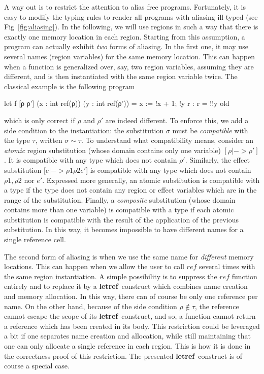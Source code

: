 \documentclass[a4paper]{llncs}
\newcommand{\letml}{{\bf let}}
\newcommand{\refml}{{\bf ref}}
\begin{document}
A way out is to restrict the attention to alias free programs. Fortunately, it
is easy to modify the typing rules to render all programs with aliasing
ill-typed (see Fig~\ref{fig:aliasing}). In the following, we will use regions
in such a way that there is exactly one memory location in each region.
Starting from this assumption, a program can actually exhibit {\em two} forms
of aliasing. In the first one, it may use several names (region variables) for
the same memory location. This can happen when a function is generalized over,
say, two region variables, assuming they are different, and is then
instantiated with the same region variable twice. The classical example is the
following program
\begin{who}
  let f [ρ ρ'] (x : int ref(ρ)) (y : int ref(ρ')) =
  { }
  x := !x + 1;
  !y
  { r : r = !!y old }
\end{who}
which is only correct if $ ρ $ and $ ρ' $ are indeed different. To enforce
this, we add a side condition to the instantiation: the substitution $σ$ must
be {\em compatible} with the type $τ$, written $σ\sim τ$. To understand what
compatibility means, consider an {\em atomic} region substitution (whose
domain contains only one variable) $[ρ|->ρ']$. It is compatible with any type
which does not contain $ρ'$. Similarly, the effect substitution $[e|-> ρ1  ρ2
e'$] is compatible with any type which does not contain $ ρ1 , ρ2 $ nor $e'$.
Expressed more generally, an atomic substitution is compatible with a type if
the type does not contain any region or effect variables which are in the
range of the substitution. Finally, a {\em composite} substitution (whose
domain contains more than one variable) is compatible with a type if each
atomic substitution is compatible with the result of the application of the
previous substitution. In this way, it becomes impossible to have different
names for a single reference cell.

The second form of aliasing is when we use the same name for {\em different}
memory locations. This can happen when we allow the user to call
$\mathit{ref}$ several times with the same region instantiation. A simple
possibility is to  suppress the $\mathit{ref}$ function entirely and to
replace it by a \letml\refml\ construct which combines name creation and
memory allocation. In this way, there can of course be only one reference per
name. On the other hand, because of the side condition $ρ\notin τ$, the
reference cannot escape the scope of its \letml\refml\ construct, and so, a
function cannot return a reference which has been created in its body. This
restriction could be leveraged a bit if one separates name creation and
allocation, while still maintaining that one can only allocate a single
reference in each region. This is how it is done in the correctness proof of
this restriction. The presented \letml\refml\ construct is of course a special
case.
\end{document}
